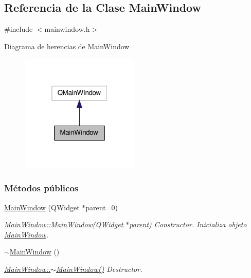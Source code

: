 \hypertarget{class_main_window}{\subsection{Referencia de la Clase Main\-Window}
\label{class_main_window}
}


{\ttfamily \#include $<$mainwindow.\-h$>$}



Diagrama de herencias de Main\-Window\nopagebreak
\begin{figure}[H]
\begin{center}
\leavevmode
\includegraphics[width=160pt]{class_main_window__inherit__graph}
\end{center}
\end{figure}
\subsubsection*{Métodos públicos}
\begin{DoxyCompactItemize}
\item 
\hyperlink{class_main_window_a8b244be8b7b7db1b08de2a2acb9409db}{Main\-Window} (Q\-Widget $\ast$parent=0)
\begin{DoxyCompactList}\small\item\em \hyperlink{class_main_window_a8b244be8b7b7db1b08de2a2acb9409db}{Main\-Window\-::\-Main\-Window(\-Q\-Widget $\ast$parent)} Constructor. Inicializa objeto \hyperlink{class_main_window}{Main\-Window}. \end{DoxyCompactList}\item 
\hyperlink{class_main_window_ae98d00a93bc118200eeef9f9bba1dba7}{$\sim$\-Main\-Window} ()
\begin{DoxyCompactList}\small\item\em \hyperlink{class_main_window_ae98d00a93bc118200eeef9f9bba1dba7}{Main\-Window\-::$\sim$\-Main\-Window()} Destructor. \end{DoxyCompactList}\end{DoxyCompactItemize}
